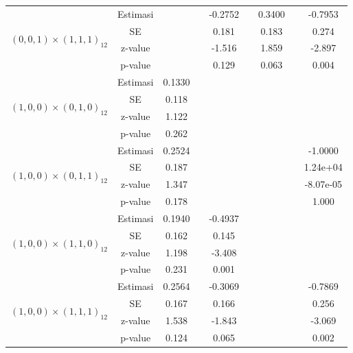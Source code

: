 \begin{enumerate}[label=\alph*.]
\begin{longtable}{|c|c|c|c|c|c|c|c|c|}
            \multirow{4}{*}{$(0,0,1)\times(1,1,1)_{12}$}
            & Estimasi & {} & {} & -0.2752 & {} & 0.3400 & {} & -0.7953 \\ \cline{2-9}
            & SE       & {} & {} & 0.181   & {} & 0.183 & {} & 0.274\\ \cline{2-9}
            & z-value  & {} & {} & -1.516  & {} & 1.859 & {} & -2.897\\ \cline{2-9}
            & p-value  & {} & {} & 0.129   & {} & 0.063 & {} & 0.004 \\ \hline

            \multirow{4}{*}{$(1,0,0)\times(0,1,0)_{12}$}
            & Estimasi & 0.1330  & {} & {} & {} & {} & {} & {} \\ \cline{2-9}
            & SE       & 0.118  & {} & {} & {} & {} & {} & {} \\ \cline{2-9}
            & z-value  & 1.122   & {} & {} & {} & {} & {} & {}\\ \cline{2-9}
            & p-value  & 0.262 & {} & {} & {} & {} & {} & {} \\ \hline

            \multirow{4}{*}{$(1,0,0)\times(0,1,1)_{12}$}
            & Estimasi & 0.2524  & {} & {} & {} & {} & {} & -1.0000 \\ \cline{2-9}
            & SE       & 0.187  & {} & {} & {} & {} & {} & 1.24e+04\\ \cline{2-9}
            & z-value  & 1.347   & {} & {} & {} & {} & {} & -8.07e-05\\ \cline{2-9}
            & p-value  & 0.178 & {} & {} & {} & {} & {} & 1.000\\ \hline

            \multirow{4}{*}{$(1,0,0)\times(1,1,0)_{12}$}
            & Estimasi & 0.1940  & {} & -0.4937 & {} & {} & {} & {}\\ \cline{2-9}
            & SE       & 0.162  & {} & 0.145 & {} & {} & {} & {}\\ \cline{2-9}
            & z-value  & 1.198   & {} & -3.408 & {} & {} & {}& {}\\ \cline{2-9}
            & p-value  & 0.231 & {} & 0.001 & {} & {} & {} & {}\\ \hline

            \multirow{4}{*}{$(1,0,0)\times(1,1,1)_{12}$}
            & Estimasi & 0.2564  & {} & -0.3069 & {} & {} & {} & -0.7869 \\ \cline{2-9}
            & SE       & 0.167    & {} & 0.166 & {} & {} & {} & 0.256\\ \cline{2-9}
            & z-value  & 1.538   & {} & -1.843 & {} & {} & {} & -3.069\\ \cline{2-9}
            & p-value  & 0.124    & {} &  0.065 & {} & {} & {} & 0.002\\ \hline


\end{longtable}
\end{enumerate}
